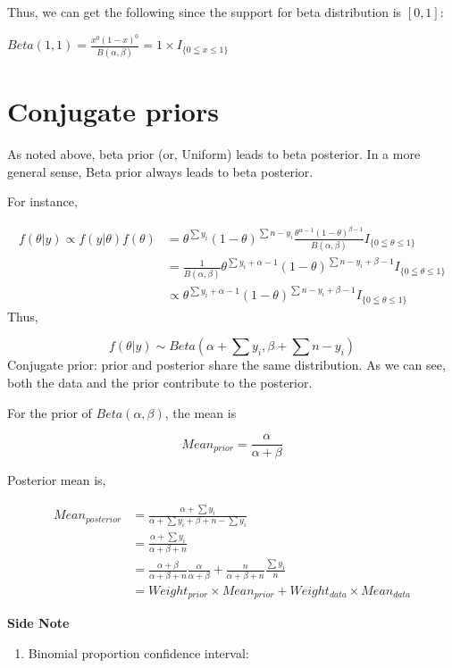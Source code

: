 \documentclass[
]{book}
\providecommand{\tightlist}{%
  \setlength{\itemsep}{0pt}\setlength{\parskip}{0pt}}
\begin{document}
Thus, we can get the following since the support for beta distribution is \([0,1]\):

\(Beta(1,1)=\frac{x^0(1-x)^0}{B(\alpha,\beta)}=1\times I_{\{0 \leqq x \leqslant 1\}}\)

\hypertarget{conjugate-priors}{%
\section{Conjugate priors}\label{conjugate-priors}}

As noted above, beta prior (or, Uniform) leads to beta posterior. In a more general sense, Beta prior always leads to beta posterior.

For instance,

\[\begin{aligned} f(\theta |y) \propto f(y|\theta)f(\theta)&=\theta^{\sum y_i}(1-\theta)^{\sum n-y_i}\frac{\theta^{\alpha-1}(1-\theta)^{\beta-1}}{B(\alpha,\beta)} I_{\{0 \leqq \theta \leqslant 1\}} \\ &=\frac{1}{B(\alpha, \beta)}\theta^{\sum y_i+\alpha-1}(1-\theta)^{\sum n-y_i+\beta-1} I_{\{0 \leqq \theta \leqslant 1\}} \\ &\propto  \theta^{\sum y_i+\alpha-1}(1-\theta)^{\sum n-y_i+\beta-1} I_{\{0 \leqq \theta \leqslant 1\}} \end{aligned}\]
Thus,

\[f(\theta |y) \sim Beta(\alpha+\sum y_i,\beta+\sum n-y_i)\]
Conjugate prior: prior and posterior share the same distribution.
As we can see, both the data and the prior contribute to the posterior.

For the prior of \(Beta(\alpha, \beta)\), the mean is

\[Mean_{prior}=\frac{\alpha}{\alpha+\beta}\]

Posterior mean is,

\[\begin{aligned} Mean_{posterior}&= \frac{\alpha+\sum y_i}{\alpha+\sum y_i+\beta+n-\sum y_i} \\ &=\frac{\alpha+\sum y_i}{\alpha+\beta+n} \\ &= \frac{\alpha+\beta}{\alpha+\beta+n}\frac{\alpha}{\alpha+\beta}+\frac{n}{\alpha+\beta+n}\frac{\sum y_i}{n} \\ &= Weight_{prior} \times Mean_{prior}+Weight_{data} \times Mean_{data}\end{aligned}\]

\textbf{Side Note}

\begin{enumerate}
\def\labelenumi{(\arabic{enumi})}
\tightlist
\item
  Binomial proportion confidence interval:
\end{enumerate}
\end{document}
